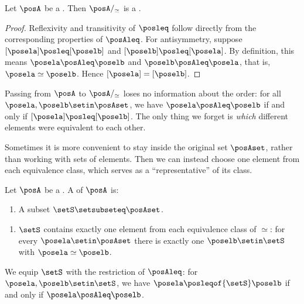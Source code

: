 \begin{lemma}
    \label{lem:preorder-quotient-is-poset}
    Let $\posA$ be a .
    Then $\posA/_{\simeq}$ is a .
\end{lemma}
\begin{proof}
    Reflexivity and transitivity of $\posleq$ follow directly from the corresponding properties of $\posAleq$.
    For antisymmetry, suppose $[\posela] \posleq [\poselb]$ and $[\poselb] \posleq [\posela]$.
    By definition, this means $\posela \posAleq \poselb$ and $\poselb \posAleq \posela$, that is, $\posela \simeq \poselb$.
    Hence $[\posela] = [\poselb]$.
\end{proof}

Passing from $\posA$ to $\posA/_{\simeq}$ loses no information about the order: for all $\posela, \poselb \setin \posAset$, we have $\posela \posAleq \poselb$ if and only if $[\posela] \posleq [\poselb]$.
The only thing we forget is \emph{which} different elements were equivalent to each other.

Sometimes it is more convenient to stay inside the original set $\posAset$, rather than working with sets of elements.
Then we can instead choose one element from each equivalence class, which serves as a ``representative'' of its class.

\begin{ctdefinition}
    \label{def:preorder-skeleton}
    Let $\posA$ be a .
    A  of $\posA$ is:

    \constit
    \begin{enumerate}
        \item A subset $\setS \setsubseteq \posAset$.
    \end{enumerate}

    \condit
    \begin{enumerate}
        \item $\setS$ contains exactly one element from each equivalence class of $\simeq$:
              for every $\posela \setin \posAset$ there is exactly one $\poselb \setin \setS$ with $\posela \simeq \poselb$.
    \end{enumerate}
    We equip $\setS$ with the restriction of $\posAleq$: for $\posela, \poselb \setin \setS$, we have $\posela \posleqof{\setS} \poselb$ if and only if $\posela \posAleq \poselb$.
\end{ctdefinition}

